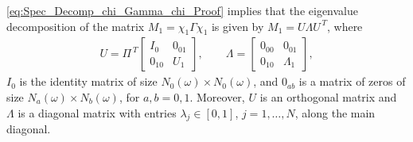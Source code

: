 \documentclass{cmslatex}
\begin{document}
\eqref{eq:Spec_Decomp_chi_Gamma_chi_Proof} implies that the
eigenvalue decomposition of the matrix $M_1=\chi_1\Gamma\chi_1$ is given by 
$M_1=U\Lambda U^{\,T}$, where
%
  \begin{align}\label{eq:Spec_Decomp_chi_Gamma_chi}
U=\Pi^{\,T}\left[
  \begin{array}{ccc}
    I_0&0_{01}\\
    0_{10}&U_1   
    \end{array}
\right],
\qquad
\Lambda=\left[
  \begin{array}{ccc}
    0_{00}&0_{01}\\
    0_{10}&\Lambda_1   
    \end{array}
\right],
  \end{align}
 $I_0$ is the identity matrix of size $N_0(\omega)\times N_0(\omega)$, and
 $0_{ab}$ is a matrix of zeros of size $N_a(\omega)\times N_b(\omega)$, for
 $a,b=0,1$. Moreover, $U$ is an orthogonal matrix and $\Lambda$ is a
diagonal matrix with entries $\lambda_j\in[0,1]$, $j=1,\ldots,N$, along the main
diagonal.    
\end{document}
